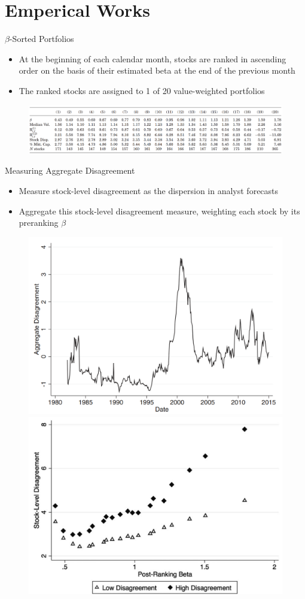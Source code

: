 \documentclass{beamer}
\begin{document}
\section{Emperical Works}
\begin{frame}{$ \beta $-Sorted Portfolios}
\begin{itemize}
\item At the beginning of each calendar month, stocks are ranked in ascending order on the basis of their estimated beta at the end of the previous month
\item The ranked stocks are assigned to 1 of 20 value-weighted portfolios
\end{itemize}
\begin{figure}
\centering
\includegraphics[width=0.9\linewidth]{t1}
\end{figure}
\end{frame}

\begin{frame}{Measuring Aggregate Disagreement}
\begin{itemize}
\item Measure stock-level disagreement as the dispersion in analyst forecasts
\item Aggregate this stock-level disagreement measure,
weighting each stock by its preranking $ \beta $ 
\end{itemize}
\begin{figure}
\centering
\includegraphics[width=0.45\linewidth]{4}
\includegraphics[width=0.45\linewidth]{5}
\end{figure}
\end{frame}
\end{document}
